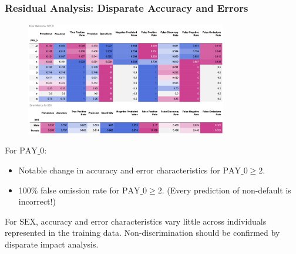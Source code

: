 \documentclass[11pt,
               aspectratio=169,
               hyperref={colorlinks}
               ]{beamer}
\begin{document}
			\begin{frame}[t]
		
				\frametitle{\textbf{Residual Analysis}: Disparate Accuracy and Errors}
		
		                 \vspace{-10pt}
				\begin{figure}
					\begin{center}
						\includegraphics[height=140pt]{../img/de.png}
					\end{center}
				\end{figure}
				\vspace{-15pt}
				\tiny For $\text{PAY\_0}$:
				\begin{itemize}
					\item Notable change in accuracy and error characteristics for $\text{PAY\_0} \geq 2$. 
					\item 100\% false omission rate for $\text{PAY\_0} \geq 2$. (Every prediction of non-default is incorrect!)
				\end{itemize}
				For $\text{SEX}$, accuracy and error characteristics vary little across individuals represented in the training data. Non-discrimination should be confirmed by disparate impact analysis.
		
			\end{frame}
\end{document}
